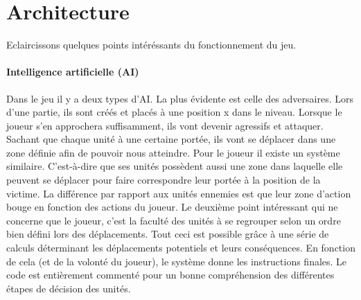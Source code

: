 \documentclass[a4paper,10pt]{article}
\begin{document}
  \pagebreak 
  \section{Architecture}
  Eclaircissons quelques points intéréssants du fonctionnement du jeu.
  \paragraph{Intelligence artificielle (AI)}
  Dans le jeu il y a deux types d'AI. La plus évidente est celle des adversaires. Lors d'une partie, ils sont créés et placés à une position x dans le niveau. Lorsque le joueur s'en approchera suffisamment, ils vont devenir agressifs et attaquer. Sachant que chaque unité à une certaine portée, ils vont se déplacer dans une zone définie afin de pouvoir nous atteindre.
  \newline Pour le joueur il existe un système similaire. C'est-à-dire que ses unités possèdent aussi une zone dans laquelle elle peuvent se déplacer pour faire correspondre leur portée à la position de la victime. La différence par rapport aux unités ennemies est que leur zone d'action bouge en fonction des actions du joueur.
  \newline Le deuxième point intéressant qui ne concerne que le joueur, c'est la faculté des unités à se regrouper selon un ordre bien défini lors des déplacements.
  \newline Tout ceci est possible grâce à une série de calculs déterminant les déplacements potentiels et leurs conséquences. En fonction de cela (et de la volonté du joueur), le système donne les instructions finales. Le code est entièrement commenté pour un bonne compréhension des différentes étapes de décision des unités.
   
\end{document}
